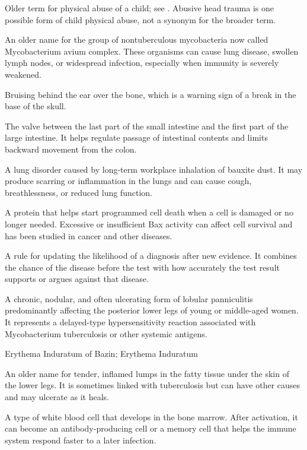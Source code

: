  Older term for physical abuse of a child; see . Abusive head trauma is one possible form of child physical abuse, not a synonym for the broader term.

 An older name for the group of nontuberculous mycobacteria now called Mycobacterium avium complex. These organisms can cause lung disease, swollen lymph nodes, or widespread infection, especially when immunity is severely weakened.

 Bruising behind the ear over the bone, which is a warning sign of a break in the base of the skull.

 The valve between the last part of the small intestine and the first part of the large intestine. It helps regulate passage of intestinal contents and limits backward movement from the colon.

 A lung disorder caused by long-term workplace inhalation of bauxite dust. It may produce scarring or inflammation in the lungs and can cause cough, breathlessness, or reduced lung function.

 A protein that helps start programmed cell death when a cell is damaged or no longer needed. Excessive or insufficient Bax activity can affect cell survival and has been studied in cancer and other diseases.

 A rule for updating the likelihood of a diagnosis after new evidence. It combines the chance of the disease before the test with how accurately the test result supports or argues against that disease.

 A chronic, nodular, and often ulcerating form of lobular panniculitis predominantly affecting the posterior lower legs of young or middle-aged women. It represents a delayed-type hypersensitivity reaction associated with Mycobacterium tuberculosis or other systemic antigens.

\synonyms
Erythema Induratum of Bazin; Erythema Induratum

 An older name for tender, inflamed lumps in the fatty tissue under the skin of the lower legs. It is sometimes linked with tuberculosis but can have other causes and may ulcerate as it heals.

 A type of white blood cell that develops in the bone marrow. After activation, it can become an antibody-producing cell or a memory cell that helps the immune system respond faster to a later infection.


